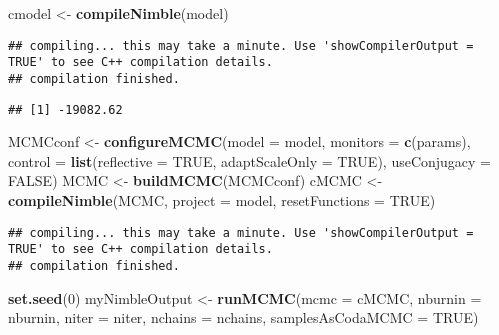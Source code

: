 \documentclass[
]{article}
\newenvironment{Shaded}{\begin{snugshade}}{\end{snugshade}}
\newcommand{\DataTypeTok}[1]{\textcolor[rgb]{0.13,0.29,0.53}{#1}}
\newcommand{\DecValTok}[1]{\textcolor[rgb]{0.00,0.00,0.81}{#1}}
\newcommand{\KeywordTok}[1]{\textcolor[rgb]{0.13,0.29,0.53}{\textbf{#1}}}
\newcommand{\NormalTok}[1]{#1}
\newcommand{\OperatorTok}[1]{\textcolor[rgb]{0.81,0.36,0.00}{\textbf{#1}}}
\newcommand{\OtherTok}[1]{\textcolor[rgb]{0.56,0.35,0.01}{#1}}
\newcommand{\StringTok}[1]{\textcolor[rgb]{0.31,0.60,0.02}{#1}}
\begin{document}
\begin{Shaded}
\begin{Highlighting}[]
\NormalTok{cmodel <-}\StringTok{ }\KeywordTok{compileNimble}\NormalTok{(model)}
\end{Highlighting}
\end{Shaded}

\begin{verbatim}
## compiling... this may take a minute. Use 'showCompilerOutput = TRUE' to see C++ compilation details.
## compilation finished.
\end{verbatim}

\begin{Shaded}
\end{Shaded}

\begin{verbatim}
## [1] -19082.62
\end{verbatim}

\begin{Shaded}
\begin{Highlighting}[]
\NormalTok{MCMCconf <-}\StringTok{ }\KeywordTok{configureMCMC}\NormalTok{(}\DataTypeTok{model =}\NormalTok{ model,}
                          \DataTypeTok{monitors =} \KeywordTok{c}\NormalTok{(params),}
                          \DataTypeTok{control =} \KeywordTok{list}\NormalTok{(}\DataTypeTok{reflective =} \OtherTok{TRUE}\NormalTok{, }\DataTypeTok{adaptScaleOnly =} \OtherTok{TRUE}\NormalTok{),}
                          \DataTypeTok{useConjugacy =} \OtherTok{FALSE}\NormalTok{)}
\NormalTok{MCMC <-}\StringTok{ }\KeywordTok{buildMCMC}\NormalTok{(MCMCconf)}
\NormalTok{cMCMC <-}\StringTok{ }\KeywordTok{compileNimble}\NormalTok{(MCMC, }\DataTypeTok{project =}\NormalTok{ model, }\DataTypeTok{resetFunctions =} \OtherTok{TRUE}\NormalTok{)}
\end{Highlighting}
\end{Shaded}

\begin{verbatim}
## compiling... this may take a minute. Use 'showCompilerOutput = TRUE' to see C++ compilation details.
## compilation finished.
\end{verbatim}

\begin{Shaded}
\begin{Highlighting}[]
\KeywordTok{set.seed}\NormalTok{(}\DecValTok{0}\NormalTok{)}
\NormalTok{myNimbleOutput <-}\StringTok{ }\KeywordTok{runMCMC}\NormalTok{(}\DataTypeTok{mcmc =}\NormalTok{ cMCMC,}
                          \DataTypeTok{nburnin =}\NormalTok{ nburnin,}
                          \DataTypeTok{niter =}\NormalTok{ niter, }
                          \DataTypeTok{nchains =}\NormalTok{ nchains, }
                          \DataTypeTok{samplesAsCodaMCMC =} \OtherTok{TRUE}\NormalTok{)}
\end{Highlighting}
\end{Shaded}
\end{document}
